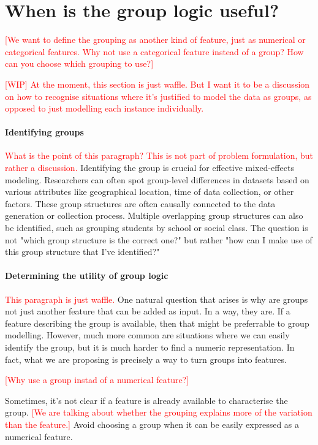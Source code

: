 \documentclass[backrefs]{cam-thesis}
\newcommand{\crit}[1]{\textcolor{red}{#1}}
\begin{document}
\section{When is the group logic useful?}

\crit{[We want to define the grouping as another kind of feature, just as numerical or categorical features. Why not use a categorical feature instead of a group? How can you choose which grouping to use?]}

\crit{[WIP] At the moment,  this section is just waffle. But I want it to be a discussion on how to recognise situations where it's justified to model the data as groups, as opposed to just modelling each instance individually.}

\paragraph{Identifying groups} \crit{What is the point of this paragraph? This is not part of problem formulation, but rather a discussion.} Identifying the group is crucial for effective mixed-effects modeling. Researchers can often spot group-level differences in datasets based on various attributes like geographical location, time of data collection, or other factors. These group structures are often causally connected to the data generation or collection process. Multiple overlapping group structures can also be identified, such as grouping students by school or social class. The question is not "which group structure is the correct one?" but rather "how can I make use of this group structure that I've identified?"

\paragraph{Determining the utility of group logic} \crit{This paragraph is just waffle.} One natural question that arises is why are groups not just another feature that can be added as input. In a way, they are. If a feature describing the group is available, then that might be preferrable to group modelling. However, much more common are situations where we can easily identify the group, but it is much harder to find a numeric representation. In fact, what we are proposing is precisely a way to turn groups into features.

\crit{[Why use a group instad of a numerical feature?]}

Sometimes, it's not clear if a feature is already available to characterise the group. \crit{[We are talking about whether the grouping explains more of the variation than the feature.]} Avoid choosing a group when it can be easily expressed as a numerical feature.
\end{document}
